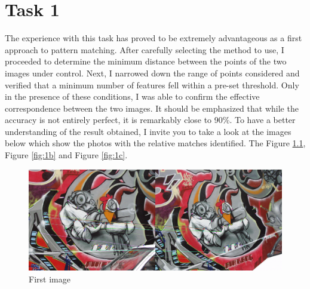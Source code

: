 
%
%         

%





\chapter{Task 1}
The experience with this task has proved to be extremely advantageous as a first approach to pattern matching. After carefully selecting the method to use, I proceeded to determine the minimum distance between the points of the two images under control. Next, I narrowed down the range of points considered and verified that a minimum number of features fell within a pre-set threshold. Only in the presence of these conditions, I was able to confirm the effective correspondence between the two images. It should be emphasized that while the accuracy is not entirely perfect, it is remarkably close to 90\%. To have a better understanding of the result obtained, I invite you to take a look at the images below which show the photos with the relative matches identified. The Figure \ref{fig:1a}, Figure \ref{fig:1b} and Figure \ref{fig:1c}.

\begin{figure}[h]
	\centering
        \begin{minipage}{0.9\textwidth}
        		\centering
		\includegraphics[width=\linewidth]{images/source/1}
		\caption{First image}
		\label{fig:1a}
        \end{minipage}
\end{figure}


